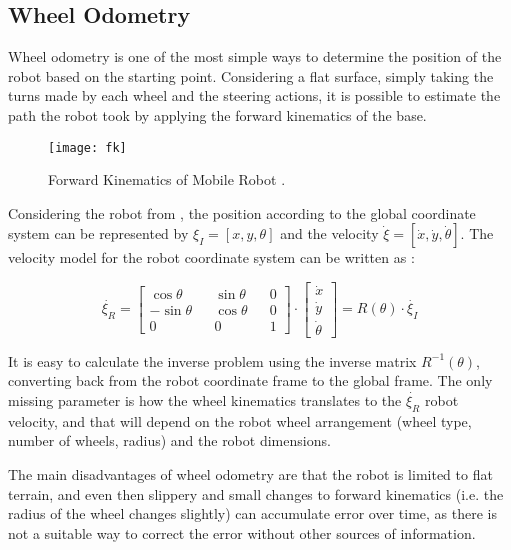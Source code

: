 \subsection{Wheel Odometry}

Wheel odometry is one of the most simple ways to determine the position of the robot based on the starting point. Considering a flat surface, simply taking the turns made by each wheel and the steering actions, it is possible to estimate the path the robot took by applying the forward kinematics of the base.

\begin{figure}
    \centering
    \texttt{[image: fk]}
    \caption{Forward Kinematics of Mobile Robot \cite{thrun2005probabilistic}.}
    \label{fig:fk}
\end{figure}

Considering the robot from , the position according to the global coordinate system can be represented by $\xi_I = [x, y, \theta]$ and the velocity $\dot{\xi} = [\dot{x}, \dot{y}, \dot{\theta}]$. The velocity model for the robot coordinate system can be written as \cite{thrun2005probabilistic}:

\begin{equation}
\dot{\xi_R} = 
\begin{bmatrix}
\cos \theta && \sin \theta && 0 \\
- \sin \theta  && \cos \theta && 0 \\
0 && 0 && 1
\end{bmatrix}
\cdot 
\begin{bmatrix}
\dot{x} \\
\dot{y} \\
\dot{\theta}
\end{bmatrix}
=
R(\theta) \cdot \dot{\xi_I}
\end{equation}

It is easy to calculate the inverse problem using the inverse matrix $R^{-1}(\theta)$, converting back from the robot coordinate frame to the global frame. The only missing parameter is how the wheel kinematics translates to the $\dot{\xi_R}$ robot velocity, and that will depend on the robot wheel arrangement (wheel type, number of wheels, radius) and the robot dimensions.

The main disadvantages of wheel odometry are that the robot is limited to flat terrain, and even then slippery and small changes to forward kinematics (i.e. the radius of the wheel changes slightly) can accumulate error over time, as there is not a suitable way to correct the error without other sources of information.

